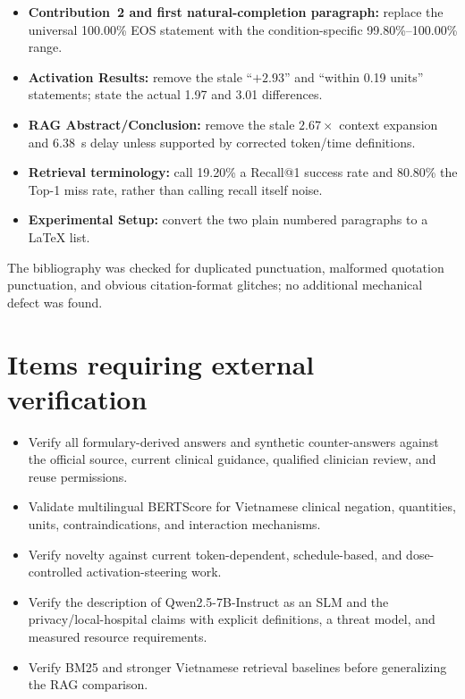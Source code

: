 \documentclass[11pt]{article}
\begin{document}
\begin{itemize}
    \item \textbf{Contribution~2 and first natural-completion paragraph:} replace the universal 100.00\% EOS statement with the condition-specific 99.80\%--100.00\% range.
    \item \textbf{Activation Results:} remove the stale ``$+2.93$'' and ``within 0.19 units'' statements; state the actual 1.97 and 3.01 differences.
    \item \textbf{RAG Abstract/Conclusion:} remove the stale $2.67\times$ context expansion and 6.38~s delay unless supported by corrected token/time definitions.
    \item \textbf{Retrieval terminology:} call 19.20\% a Recall@1 success rate and 80.80\% the Top-1 miss rate, rather than calling recall itself noise.
    \item \textbf{Experimental Setup:} convert the two plain numbered paragraphs to a LaTeX list.
\end{itemize}

The bibliography was checked for duplicated punctuation, malformed quotation punctuation, and obvious citation-format glitches; no additional mechanical defect was found.

\section*{Items requiring external verification}

\begin{itemize}
    \item Verify all formulary-derived answers and synthetic counter-answers against the official source, current clinical guidance, qualified clinician review, and reuse permissions.
    \item Validate multilingual BERTScore for Vietnamese clinical negation, quantities, units, contraindications, and interaction mechanisms.
    \item Verify novelty against current token-dependent, schedule-based, and dose-controlled activation-steering work.
    \item Verify the description of Qwen2.5-7B-Instruct as an SLM and the privacy/local-hospital claims with explicit definitions, a threat model, and measured resource requirements.
    \item Verify BM25 and stronger Vietnamese retrieval baselines before generalizing the RAG comparison.
\end{itemize}
\end{document}
